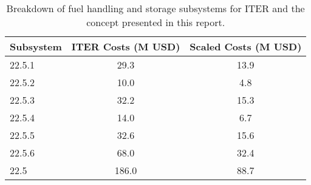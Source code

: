 \begin{table}
    \centering
    \begin{tabular}{lcc}
    \hline
        Subsystem & ITER Costs (M USD) & Scaled Costs (M USD)\\
        \hline
       22.5.1  & 29.3 & 13.9\\
       22.5.2  & 10.0 & 4.8\\
       22.5.3  & 32.2 & 15.3\\
       22.5.4  & 14.0 & 6.7\\
       22.5.5  & 32.6 & 15.6\\
       22.5.6  & 68.0 & 32.4\\
       22.5    & 186.0   & 88.7\\
       \hline
    \end{tabular}
    \caption{Breakdown of fuel handling and storage subsystems for ITER and the concept presented in this report.}
    \label{tab:fuel}
\end{table}
